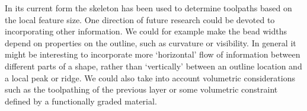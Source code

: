 In its current form the skeleton has been used to determine toolpaths based on the local feature size.
One direction of future research could be devoted to incorporating other information.
We could for example make the bead widths depend on properties on the outline, such as curvature or visibility.
In general it might be interesting to incorporate more `horizontal' flow of information between different parts of a shape, rather than `vertically' between an outline location and a local peak or ridge.
We could also take into account volumetric considerations such as the toolpathing of the previous layer or some volumetric constraint defined by a functionally graded material.

